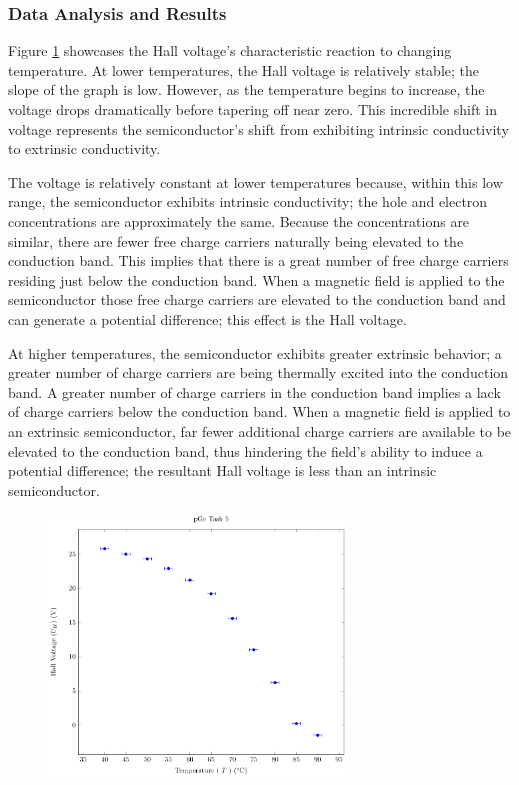 \documentclass[a4paper]{article}
\begin{document}
\subsubsection{Data Analysis and Results}
\qq Figure \ref{task25plot} showcases the Hall voltage's characteristic reaction
to changing temperature. At lower temperatures, the Hall voltage is relatively
stable; the slope of the graph is low. However, as the temperature begins to
increase, the voltage drops dramatically before tapering off near zero. This
incredible shift in voltage represents the semiconductor's shift from exhibiting
intrinsic conductivity to extrinsic conductivity. 

\qq The voltage is relatively constant at lower temperatures because, within
this low range, the semiconductor exhibits intrinsic conductivity; the hole and
electron concentrations are approximately the same. Because the concentrations
are similar, there are fewer free charge carriers naturally being elevated to
the conduction band. This implies that there is a great number of free charge
carriers residing just below the conduction band. When a magnetic field is
applied to the semiconductor those free charge carriers are elevated to the
conduction band and can generate a potential difference; this effect is the Hall
voltage.

\qq At higher temperatures, the semiconductor exhibits greater extrinsic
behavior; a greater number of charge carriers are being thermally excited into
the conduction band. A greater number of charge carriers in the conduction band
implies a lack of charge carriers below the conduction band. When a magnetic
field is applied to an extrinsic semiconductor, far fewer additional charge
carriers are available to be elevated to the conduction band, thus hindering the
field's ability to induce a potential difference; the resultant Hall voltage is
less than an intrinsic semiconductor.

\begin{figure}[H]
\centering
\includegraphics[width=0.7\textwidth]{PGePlots/Task5/pGeTask5.pdf}
\label{task25plot}
\end{figure}
\end{document}
